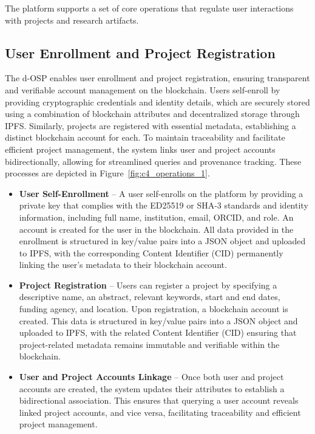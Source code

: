 \documentclass[final]{rc-book-2.14}
\begin{document}
The platform supports a set of core operations that regulate user interactions with projects and research artifacts.

\subsection{User Enrollment and Project Registration}

\sloppy
The d-OSP enables user enrollment and project registration, ensuring transparent and verifiable account management on the blockchain. Users self-enroll by providing cryptographic credentials and identity details, which are securely stored using a combination of blockchain attributes and decentralized storage through IPFS. Similarly, projects are registered with essential metadata, establishing a distinct blockchain account for each. To maintain traceability and facilitate efficient project management, the system links user and project accounts bidirectionally, allowing for streamlined queries and provenance tracking. These processes are depicted in Figure~\ref{fig:c4_operations_1}.
\fussy

\begin{itemize}
    \item \textbf{User Self-Enrollment} – A user self-enrolls on the platform by providing a private key that complies with the ED25519 or SHA-3 standards and identity information, including full name, institution, email, ORCID, and role. An account is created for the user in the blockchain. All data provided in the enrollment is structured in key/value pairs into a JSON object and uploaded to IPFS, with the corresponding Content Identifier (CID) permanently linking the user’s metadata to their blockchain account.

    \item \textbf{Project Registration} – Users can register a project by specifying a descriptive name, an abstract, relevant keywords, start and end dates, funding agency, and location. Upon registration, a blockchain account is created. This data is structured in key/value pairs into a JSON object and uploaded to IPFS, with the related Content Identifier (CID) ensuring that project-related metadata remains immutable and verifiable within the blockchain.

    \item \textbf{User and Project Accounts Linkage} – Once both user and project accounts are created, the system updates their attributes to establish a bidirectional association. This ensures that querying a user account reveals linked project accounts, and vice versa, facilitating traceability and efficient project management.
\end{itemize}
\end{document}
